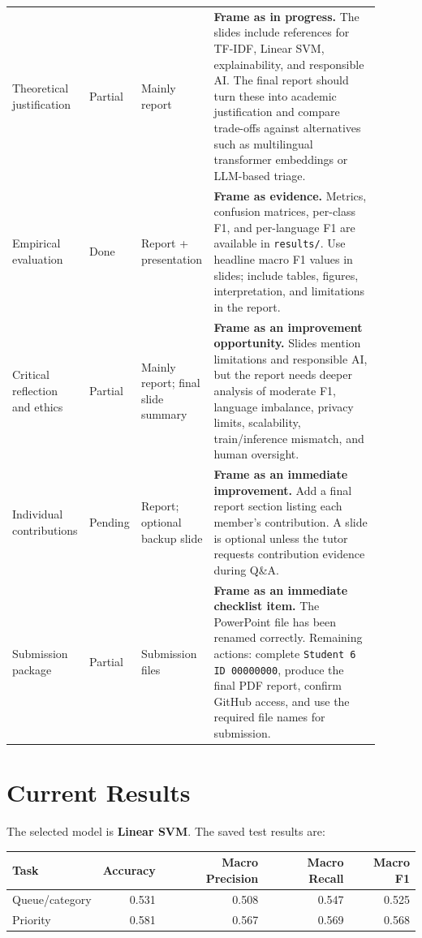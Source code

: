 \documentclass[11pt,a4paper]{article}
\newcommand{\done}{\textcolor{green!45!black}{Done}}
\newcommand{\partialstatus}{\textcolor{orange!80!black}{Partial}}
\newcommand{\todo}{\textcolor{red!70!black}{Pending}}
\begin{document}
\begin{longtable}{>{\raggedright\arraybackslash}p{0.18\linewidth} >{\raggedright\arraybackslash}p{0.11\linewidth} >{\raggedright\arraybackslash}p{0.16\linewidth} >{\raggedright\arraybackslash}p{0.45\linewidth}}
\addlinespace
Theoretical justification & \partialstatus & Mainly report & \textbf{Frame as in progress.} The slides include references for TF-IDF, Linear SVM, explainability, and responsible AI. The final report should turn these into academic justification and compare trade-offs against alternatives such as multilingual transformer embeddings or LLM-based triage. \\
\addlinespace
Empirical evaluation & \done & Report + presentation & \textbf{Frame as evidence.} Metrics, confusion matrices, per-class F1, and per-language F1 are available in \texttt{results/}. Use headline macro F1 values in slides; include tables, figures, interpretation, and limitations in the report. \\
\addlinespace
Critical reflection and ethics & \partialstatus & Mainly report; final slide summary & \textbf{Frame as an improvement opportunity.} Slides mention limitations and responsible AI, but the report needs deeper analysis of moderate F1, language imbalance, privacy limits, scalability, train/inference mismatch, and human oversight. \\
\addlinespace
Individual contributions & \todo & Report; optional backup slide & \textbf{Frame as an immediate improvement.} Add a final report section listing each member's contribution. A slide is optional unless the tutor requests contribution evidence during Q\&A. \\
\addlinespace
Submission package & \partialstatus & Submission files & \textbf{Frame as an immediate checklist item.} The PowerPoint file has been renamed correctly. Remaining actions: complete \texttt{Student 6 ID 00000000}, produce the final PDF report, confirm GitHub access, and use the required file names for submission. \\
\bottomrule
\end{longtable}
\renewcommand{\arraystretch}{1.0}
\normalsize

\section{Current Results}
The selected model is \textbf{Linear SVM}. The saved test results are:

\begin{center}
\begin{tabular}{lrrrr}
\toprule
\textbf{Task} & \textbf{Accuracy} & \textbf{Macro Precision} & \textbf{Macro Recall} & \textbf{Macro F1} \\
\midrule
Queue/category & 0.531 & 0.508 & 0.547 & 0.525 \\
Priority & 0.581 & 0.567 & 0.569 & 0.568 \\
\bottomrule
\end{tabular}
\end{center}
\end{document}
